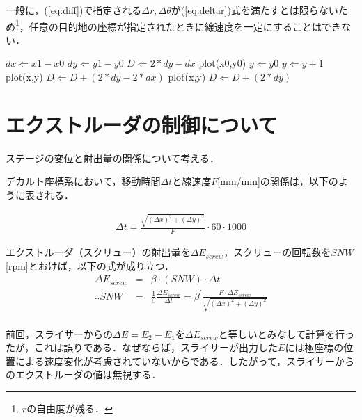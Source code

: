 \documentclass[twocolumn,oneside,a4paper]{article}
\begin{document}
一般に，(\ref{eq:diff})で指定される$\Delta r, \Delta \theta$が(\ref{eq:deltar})式を満たすとは限らないため\footnote{$r$の自由度が残る．}，任意の目的地の座標が指定されたときに線速度を一定にすることはできない．

\begin{algorithm}                  
\begin{algorithmic}                  
\label{alg1}                          
\STATE $dx \Leftarrow x1-x0$
\STATE $dy \Leftarrow y1-y0$
\STATE $D \Leftarrow 2*dy - dx$
\STATE plot(x0,y0)
\STATE $y \Leftarrow y0$
\STATE      $y \Leftarrow y+1$
\STATE      plot(x,y)
\STATE      $D \Leftarrow D + (2*dy-2*dx)$
\ELSE
\STATE      plot(x,y)
\STATE      $D \Leftarrow D + (2*dy)$
\ENDIF
\ENDFOR
\end{algorithmic}
\end{algorithm}

\section{エクストルーダの制御について}
ステージの変位と射出量の関係について考える．

デカルト座標系において，移動時間$\Delta t$と線速度$F$[mm/min]の関係は，以下のように表される．

\begin{eqnarray}
	\Delta t = \frac{\sqrt{(\Delta x)^2+(\Delta y)^2}}{F}\cdot 60\cdot1000
\end{eqnarray}

エクストルーダ（スクリュー）の射出量を$\Delta E_{screw}$，スクリューの回転数を$SNW$[rpm]とおけば，以下の式が成り立つ．
\begin{eqnarray}
	\Delta E_{screw} &=& \beta \cdot (SNW) \cdot \Delta t \nonumber \\
	\therefore SNW &=& \frac{1}{\beta} \frac{\Delta E_{screw}}{\Delta t} = \beta^\prime \frac{F\cdot \Delta E_{screw}}{\sqrt{(\Delta x)^2+(\Delta y)^2}} \nonumber \\
\end{eqnarray}

前回，スライサーからの$\Delta E=E_2-E_1$を$\Delta E_{screw}$と等しいとみなして計算を行ったが，これは誤りである．なぜならば，スライサーが出力した$E$には極座標の位置による速度変化が考慮されていないからである．したがって，スライサーからのエクストルーダの値は無視する．
\end{document}
